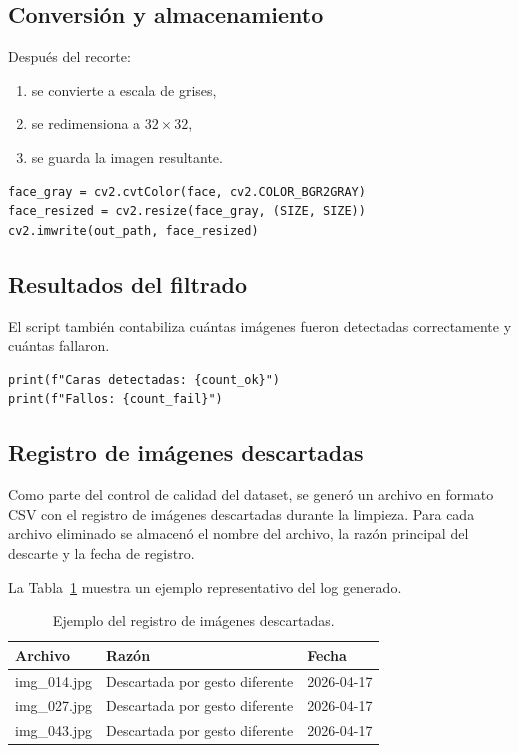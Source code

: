 \documentclass[12pt,a4paper]{article}
\begin{document}
\subsection{Conversión y almacenamiento}
Después del recorte:
\begin{enumerate}
    \item se convierte a escala de grises,
    \item se redimensiona a $32\times32$,
    \item se guarda la imagen resultante.
\end{enumerate}

\begin{lstlisting}
face_gray = cv2.cvtColor(face, cv2.COLOR_BGR2GRAY)
face_resized = cv2.resize(face_gray, (SIZE, SIZE))
cv2.imwrite(out_path, face_resized)
\end{lstlisting}

\subsection{Resultados del filtrado}
El script también contabiliza cuántas imágenes fueron detectadas correctamente y cuántas fallaron.

\begin{lstlisting}
print(f"Caras detectadas: {count_ok}")
print(f"Fallos: {count_fail}")
\end{lstlisting}

\subsection{Registro de imágenes descartadas}
Como parte del control de calidad del dataset, se generó un archivo en formato CSV con el registro de imágenes descartadas durante la limpieza. Para cada archivo eliminado se almacenó el nombre del archivo, la razón principal del descarte y la fecha de registro.

La Tabla~\ref{tab:descartadas} muestra un ejemplo representativo del log generado.

\begin{table}[H]
\centering
\caption{Ejemplo del registro de imágenes descartadas.}
\label{tab:descartadas}
\begin{tabular}{lll}
\toprule
\textbf{Archivo} & \textbf{Razón} & \textbf{Fecha} \\
\midrule
img\_014.jpg & Descartada por gesto diferente & 2026-04-17 \\
img\_027.jpg & Descartada por gesto diferente & 2026-04-17 \\
img\_043.jpg & Descartada por gesto diferente & 2026-04-17 \\
\bottomrule
\end{tabular}
\end{table}
\end{document}
